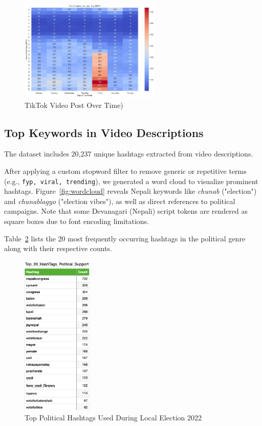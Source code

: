 \documentclass[12pt,a4paper]{report}
\begin{document}
\begin{figure}[htbp]
    \centering
    \includegraphics[width=0.60\textwidth]{figures/EDA/heatmap_post_count.jpg}
    \caption{TikTok Video Post Over Time)}
    \label{fig:tiktok_heatmap_postcount}
\end{figure}


\subsection{Top Keywords in Video Descriptions}

The dataset includes 20,237 unique hashtags extracted from video descriptions. 

After applying a custom stopword filter to remove generic or repetitive terms (e.g., \texttt{fyp, viral, trending}), we generated a word cloud to visualize prominent hashtags. Figure~\ref{fig:wordcloud} reveals Nepali keywords like \textit{chunab} ("election") and \textit{chunablagyo} ("election vibes"), as well as direct references to political campaigns. Note that some Devanagari (Nepali) script tokens are rendered as square boxes due to font encoding limitations.

Table~\ref{fig:top_political_hashtag} lists the 20 most frequently occurring hashtags in the political genre along with their respective counts.

\begin{figure}[htbp]
    \centering
    \includegraphics[width=0.30\textwidth]{figures/EDA/Top_20_Political_Hashtag.png}
    \caption{Top Political Hashtags Used During Local Election 2022}
    \label{fig:top_political_hashtag}
\end{figure}
\end{document}
